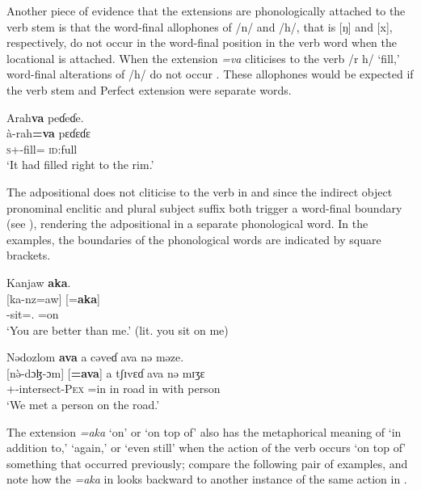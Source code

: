 Another piece of evidence that the extensions are phonologically attached to the verb stem is that the word-final allophones of /n/ and /h/, that is [ŋ] and [x], respectively, do not occur in the word-final position in the verb word when the locational is attached. When the extension \textit{=va} cliticises to the verb /r h/ ‘fill,’ word-final alterations of /h/ do not occur . These allophones would be expected if the verb stem and Perfect extension were separate words. 

\ea\label{ex:7:96}
Arah\textbf{va}  peɗeɗe.\\
\gll  à-rah\textbf{=va}    pɛɗɛɗɛ\\
      \textsc{s}+{\PFV}-fill={\PRF}  \textsc{id}:full\\
\glt  ‘It had filled right to the rim.’\\
\z 

The adpositional does not cliticise to the verb in  and  since the indirect object pronominal enclitic and plural subject suffix both trigger a word-final boundary (see ), rendering the adpositional in a separate phonological word. In the examples, the boundaries of the phonological words are indicated by square brackets. 

\ea\label{ex:7:97}
Kanjaw  \textbf{aka}.\\
\gll  {}[ka-nz=aw]   [=\textbf{aka}]\\
      {\twoS}-sit={\oneS}.{\IO}    \hspaceThis{[}=on\\
\glt  ‘You are better than me.’ (lit. you sit on me)\\
\z 

\ea\label{ex:7:98}
Nədozlom  \textbf{ava}  a cəveɗ  ava  nə  məze.\\
\gll  {}[n\`ə-dɔɮ-ɔm]      [\textbf{=ava}]  a  tʃɪvɛɗ  ava  nə  mɪʒɛ\\
      {\oneS}+{\PFV}-intersect-\textsc{Pex}  \hspaceThis{[}=in    in  road  in  with  person\\
\glt  ‘We met a person on the road.’\\
\z 

The extension \textit{=aka} ‘on’ or ‘on top of’ also has the metaphorical meaning of ‘in addition to,’ ‘again,’ or ‘even still’ when the action of the verb occurs ‘on top of’ something that occurred previously; compare the following pair of examples, and note how the \textit{=aka} in  looks backward to another instance of the same action in . 


